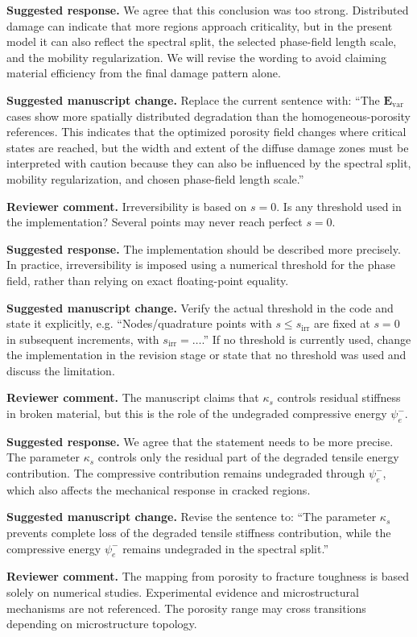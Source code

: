 \documentclass[11pt,a4paper]{article}
\newcommand{\Evar}{\ensuremath{\mathbf{E}_{\mathrm{var}}}}
\newcommand{\comment}[1]{\par\noindent\textbf{Reviewer comment.} #1\par}
\newcommand{\response}[1]{\par\noindent\textbf{Suggested response.} #1\par}
\newcommand{\change}[1]{\par\noindent\textbf{Suggested manuscript change.} #1\par}
\begin{document}
\response{We agree that this conclusion was too strong. Distributed damage can
indicate that more regions approach criticality, but in the present model it can
also reflect the spectral split, the selected phase-field length scale, and the
mobility regularization. We will revise the wording to avoid claiming material
efficiency from the final damage pattern alone.}

\change{Replace the current sentence with: ``The \Evar cases show more
spatially distributed degradation than the homogeneous-porosity references.
This indicates that the optimized porosity field changes where critical states
are reached, but the width and extent of the diffuse damage zones must be
interpreted with caution because they can also be influenced by the spectral
split, mobility regularization, and chosen phase-field length scale.''}

\comment{Irreversibility is based on \(s=0\). Is any threshold used in the
implementation? Several points may never reach perfect \(s=0\).}

\response{The implementation should be described more precisely. In practice,
irreversibility is imposed using a numerical threshold for the phase field,
rather than relying on exact floating-point equality.}

\change{Verify the actual threshold in the code and state it explicitly, e.g.
``Nodes/quadrature points with \(s \le s_{\mathrm{irr}}\) are fixed at
\(s=0\) in subsequent increments, with \(s_{\mathrm{irr}}=\ldots\).'' If no
threshold is currently used, change the implementation in the revision stage or
state that no threshold was used and discuss the limitation.}

\comment{The manuscript claims that \(\kappa_s\) controls residual stiffness in
broken material, but this is the role of the undegraded compressive energy
\(\psi_e^-\).}

\response{We agree that the statement needs to be more precise. The parameter
\(\kappa_s\) controls only the residual part of the degraded tensile energy
contribution. The compressive contribution remains undegraded through
\(\psi_e^-\), which also affects the mechanical response in cracked regions.}

\change{Revise the sentence to: ``The parameter \(\kappa_s\) prevents complete
loss of the degraded tensile stiffness contribution, while the compressive
energy \(\psi_e^-\) remains undegraded in the spectral split.''}

\comment{The mapping from porosity to fracture toughness is based solely on
numerical studies. Experimental evidence and microstructural mechanisms are not
referenced. The porosity range may cross transitions depending on
microstructure topology.}
\end{document}
